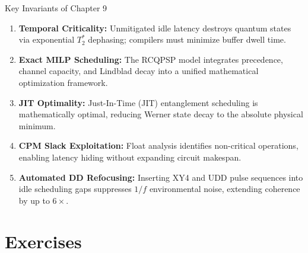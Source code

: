 \begin{summarybox}{Key Invariants of Chapter 9}
\begin{enumerate}
    \item \textbf{Temporal Criticality:} Unmitigated idle latency destroys quantum states via exponential $T_2^*$ dephasing; compilers must minimize buffer dwell time.
    \item \textbf{Exact MILP Scheduling:} The RCQPSP model integrates precedence, channel capacity, and Lindblad decay into a unified mathematical optimization framework.
    \item \textbf{JIT Optimality:} Just-In-Time (JIT) entanglement scheduling is mathematically optimal, reducing Werner state decay to the absolute physical minimum.
    \item \textbf{CPM Slack Exploitation:} Float analysis identifies non-critical operations, enabling latency hiding without expanding circuit makespan.
    \item \textbf{Automated DD Refocusing:} Inserting XY4 and UDD pulse sequences into idle scheduling gaps suppresses $1/f$ environmental noise, extending coherence by up to $6\times$.
\end{enumerate}
\end{summarybox}


\section*{Exercises}

